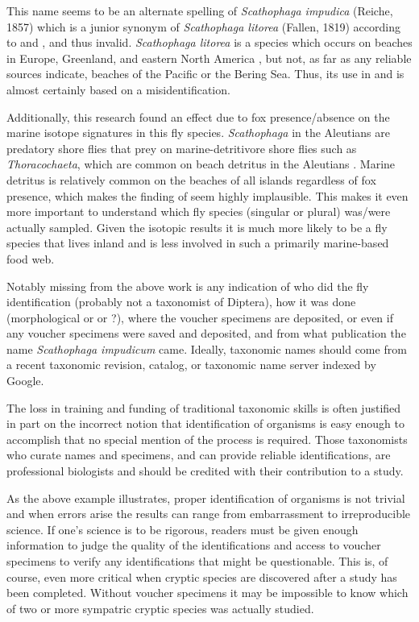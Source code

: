 This name seems to be an alternate spelling of \textit{Scathophaga impudica} (Reiche, 1857) which is a junior synonym of \textit{Scathophaga litorea} (Fallen, 1819) according to \citet{Vockeroth1965} and \citet{Sifner2008}, and thus invalid. \textit{Scathophaga litorea} is a species which occurs on beaches in Europe, Greenland, and eastern North America \citep{Vockeroth1965, Sifner2008, GBIF2020Scathophagalitorea}, but not, as far as any reliable sources indicate, beaches of the Pacific or the Bering Sea. Thus, its use in \citet{Croll2005} and \citet{Maronetal2006} is almost certainly based on a misidentification. 

Additionally, this research found an effect due to fox presence/absence on the marine isotope signatures in this fly species. \textit{Scathophaga} in the Aleutians are predatory shore flies that prey on marine-detritivore shore flies such as \textit{Thoracochaeta}, which are common on beach detritus in the Aleutians \citep[e.g.,][]{Walkeretal2013}. Marine detritus is relatively common on the beaches of all islands regardless of fox presence, which makes the finding of \citet{Croll2005} seem highly implausible. This makes it even more important to understand which fly species (singular or plural) was/were actually sampled. Given the isotopic results it is much more likely to be a fly species that lives inland and is less involved in such a primarily marine-based food web.

Notably missing from the above work is any indication of who did the fly identification (probably not a taxonomist of Diptera), how it was done (morphological or  or ?), where the voucher specimens are deposited, or even if any voucher specimens were saved and deposited, and from what publication the name \textit{Scathophaga impudicum} came. Ideally, taxonomic names should come from a recent taxonomic revision, catalog, or taxonomic name server indexed by Google.

The loss in training and funding of traditional taxonomic skills is often justified in part on the incorrect notion that identification of organisms is easy enough to accomplish that no special mention of the process is required. Those taxonomists who curate names and specimens, and can provide reliable identifications, are professional biologists and should be credited with their contribution to a study.

 As the above example illustrates, proper identification of organisms is not trivial and when errors arise the results can range from embarrassment to irreproducible science. If one’s science is to be rigorous, readers must be given enough information to judge the quality of the identifications and access to voucher specimens to verify any identifications that might be questionable. This is, of course, even more critical when cryptic species are discovered after a study has been completed. Without voucher specimens it may be impossible to know which of two or more sympatric cryptic species was actually studied.


